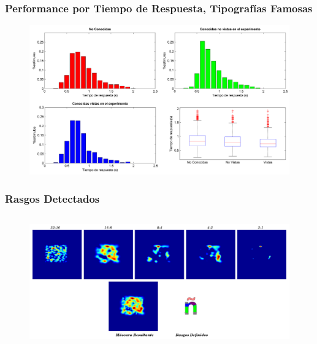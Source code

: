\documentclass[10pt]{beamer}
\begin{document}
   	\begin{frame}
	\frametitle{Performance por Tiempo de Respuesta, Tipografías Famosas}
	    \begin{figure}
		\includegraphics[width=\textwidth]{graficos/tiempoRespuesta_PorFamosas.png}
	    \end{figure}
	\end{frame}

 	\begin{frame}
	\frametitle{Rasgos Detectados}
	\begin{columns}[t]
	\begin{figure}
	    \includegraphics[width=\textwidth]{graficos/mascarasResultantes_enie_1_min.png}
	\end{figure}


      \end{columns}
\end{frame}
\end{document}
